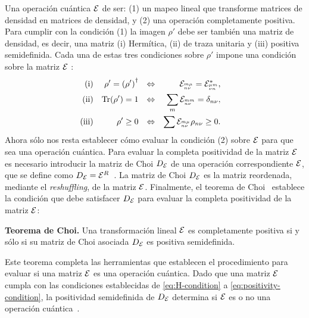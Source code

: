 Una operación cuántica $\mathcal{E}$ de ser: (1) un mapeo lineal que
transforme matrices de densidad en matrices de densidad, y (2) una 
operación completamente positiva. 
Para cumplir con la condición (1) la imagen $\rho'$ debe ser también 
una matriz de densidad, es decir, una matriz (i) Hermítica, 
(ii) de traza unitaria y (iii) positiva semidefinida. 
Cada una de estas tres condiciones sobre $\rho'$ impone una condición 
sobre la matriz $\mathcal{E}$ \cite{bengtsson_zyczkowski_2017}:
\begin{align}
\text{(i)}&& \rho'=\qty(\rho')^{\dagger}&&\Leftrightarrow
    && \mathcal{E}_{{}^{m\mu}_{n\nu}}=\mathcal{E}_{{}^{\mu m}_{\nu n}}^*,&&
    \label{eq:H-condition}\\
\text{(ii)}&&\Tr(\rho')=1
    &&\Leftrightarrow&&  \sum_{m}\mathcal{E}_{{}^{mm}_{n\nu}}=\delta_{n\nu},\\     
\text{(iii)}&&\rho'\geq0
    &&\Leftrightarrow&&  \sum\mathcal{E}_{{}^{m\mu}_{n\nu}}\rho_{n\nu}\geq0.
    \label{eq:positivity-condition}
\end{align}
  
Ahora sólo nos resta establecer cómo evaluar la condición (2) sobre $\mathcal{E}$
para que sea una operación cuántica. 
Para evaluar la completa positividad de la matriz $\mathcal{E}$
es necesario introducir la matriz de Choi $D_{\mathcal{E}}$ 
de una operación correspondiente $\mathcal{E}$, que se define como 
$D_{\mathcal{E}}=\mathcal{E}^{R}$~\cite{bengtsson_zyczkowski_2017}.
La matriz de Choi $D_{\mathcal{E}}$ es la matriz reordenada, mediante
el \textit{reshuffling}, de la matriz $\mathcal{E}$. 
Finalmente, el teorema de Choi~\cite{bengtsson_zyczkowski_2017}
establece la condición que debe satisfacer $D_{\mathcal{E}}$ para 
evaluar la completa positividad de la matriz $\mathcal{E}$:
\begin{teorema}{\textbf{Teorema de Choi.}}
Una transformación lineal $\mathcal{E}$ es completamente positiva si y sólo si 
su matriz de Choi asociada $D_{\mathcal{E}}$ es positiva semidefinida.
\end{teorema}
Este teorema completa las herramientas que establecen el procedimiento 
para evaluar si una matriz $\mathcal{E}$ es una operación cuántica. 
Dado que una matriz $\mathcal{E}$ cumpla con las condiciones establecidas de
\eqref{eq:H-condition} a \eqref{eq:positivity-condition}, la positividad
semidefinida de $D_{\mathcal{E}}$ determina si $\mathcal{E}$ es 
o no una operación cuántica~\cite{bengtsson_zyczkowski_2017}.


